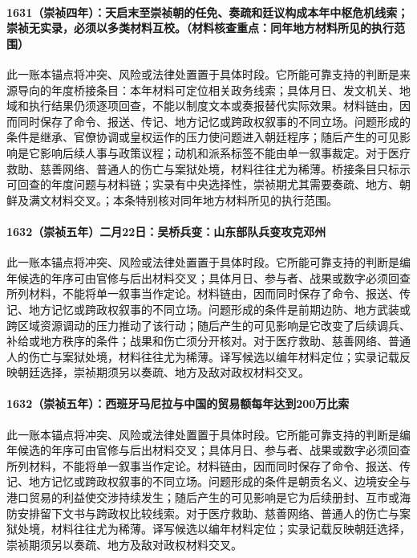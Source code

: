\paragraph{1631（崇祯四年）：天启末至崇祯朝的任免、奏疏和廷议构成本年中枢危机线索；崇祯无实录，必须以多类材料互校。（材料核查重点：同年地方材料所见的执行范围）} 此一账本锚点将冲突、风险或法律处置置于具体时段。它所能可靠支持的判断是来源导向的年度桥接条目：本年材料可定位相关政务线索；具体月日、发文机关、地域和执行结果仍须逐项回查，不能以制度文本或奏报替代实际效果。材料链由，因而同时保存了命令、报送、传记、地方记忆或跨政权叙事的不同立场。问题形成的条件是继承、官僚协调或皇权运作的压力使问题进入朝廷程序；随后产生的可见影响是它影响后续人事与政策议程；动机和派系标签不能由单一叙事裁定。对于医疗救助、慈善网络、普通人的伤亡与案狱处境，材料往往尤为稀薄。桥接条目只标示可回查的年度问题与材料链；实录有中央选择性，崇祯期尤其需要奏疏、地方、朝鲜及满文材料交叉。；本条特别核对同年地方材料所见的执行范围。

\paragraph{1632（崇祯五年）二月22日：吴桥兵变：山东部队兵变攻克邓州} 此一账本锚点将冲突、风险或法律处置置于具体时段。它所能可靠支持的判断是编年候选的年序可由官修与后出材料交叉；具体月日、参与者、战果或数字必须回查所列材料，不能将单一叙事当作定论。材料链由，因而同时保存了命令、报送、传记、地方记忆或跨政权叙事的不同立场。问题形成的条件是前期边防、地方武装或跨区域资源调动的压力推动了该行动；随后产生的可见影响是它改变了后续调兵、补给或地方秩序的条件；战果和伤亡须分开核对。对于医疗救助、慈善网络、普通人的伤亡与案狱处境，材料往往尤为稀薄。译写候选以编年材料定位；实录记载反映朝廷选择，崇祯期须另以奏疏、地方及敌对政权材料交叉。

\paragraph{1632（崇祯五年）：西班牙马尼拉与中国的贸易额每年达到200万比索} 此一账本锚点将冲突、风险或法律处置置于具体时段。它所能可靠支持的判断是编年候选的年序可由官修与后出材料交叉；具体月日、参与者、战果或数字必须回查所列材料，不能将单一叙事当作定论。材料链由，因而同时保存了命令、报送、传记、地方记忆或跨政权叙事的不同立场。问题形成的条件是朝贡名义、边境安全与港口贸易的利益使交涉持续发生；随后产生的可见影响是它为后续册封、互市或海防安排留下文书与跨政权比较线索。对于医疗救助、慈善网络、普通人的伤亡与案狱处境，材料往往尤为稀薄。译写候选以编年材料定位；实录记载反映朝廷选择，崇祯期须另以奏疏、地方及敌对政权材料交叉。

